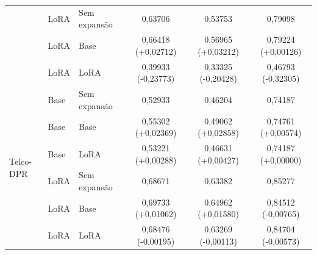 \begin{table}[htbp]
{\begin{tabular}{lllccc}
 & LoRA & Sem expansão & 0,63706 & 0,53753 & 0,79098 \\
 & LoRA & Base & 0,66418 (+0,02712) & 0,56965 (+0,03212) & 0,79224 (+0,00126) \\
 & LoRA & LoRA & 0,39933 (-0,23773) & 0,33325 (-0,20428) & 0,46793 (-0,32305) \\
\hline
\multirow{6}{*}{Telco-DPR} & Base & Sem expansão & 0,52933 & 0,46204 & 0,74187 \\
 & Base & Base & 0,55302 (+0,02369) & 0,49062 (+0,02858) & 0,74761 (+0,00574) \\
 & Base & LoRA & 0,53221 (+0,00288) & 0,46631 (+0,00427) & 0,74187 (+0,00000) \\
 & LoRA & Sem expansão & 0,68671 & 0,63382 & 0,85277 \\
 & LoRA & Base & 0,69733 (+0,01062) & 0,64962 (+0,01580) & 0,84512 (-0,00765) \\
 & LoRA & LoRA & 0,68476 (-0,00195) & 0,63269 (-0,00113) & 0,84704 (-0,00573) \\
\hline
\end{tabular}
}
\end{table}

